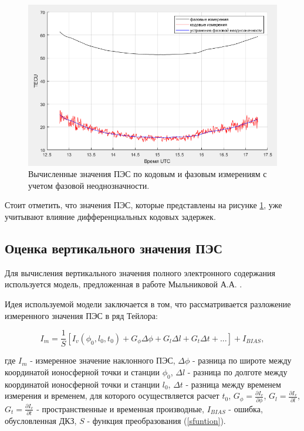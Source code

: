 \documentclass[14pt]{article}
\begin{document}
\begin{figure}[h!]
\centering
\includegraphics[width = 1\linewidth]{pics/stec.png}
\caption{Вычисленные значения ПЭС по кодовым и фазовым измерениям с учетом фазовой неоднозначности.}
\label{stecplot}
\end{figure}

Стоит отметить, что значения ПЭС, которые представлены на рисунке \ref{stecplot}, уже учитывают влияние дифференциальных кодовых задержек.

\subsection{Оценка вертикального значения ПЭС}
Для вычисления вертикального значения полного электронного содержания используется модель, предложенная в работе Мыльниковой А.А. \cite{milnikova}.

Идея используемой модели заключается в том, что рассматривается разложение измеренного значения ПЭС в ряд Тейлора:

\begin{equation}
I_m = \frac{1}{S} \left[ I_v(\phi_0, l_0, t_0) + G_{\phi} \Delta\phi + G_l \Delta l + G_t \Delta t + ... \right] + I_{BIAS},
\label{taylor}
\end{equation}

где $I_m$ - измеренное значение наклонного ПЭС, $\Delta\phi$ - разница по широте между координатой ионосферной точки и станции $\phi_0$, $\Delta l$ - разница по долготе между координатой ионосферной точки и станции $l_0$, $\Delta t$ - разница между временем измерения и временем, для которого осуществляется расчет $t_0$, $G_{\phi} = \frac{\partial I_v}{\partial \phi}$, $G_l = \frac{\partial I_v}{\partial l}$, $G_t = \frac{\partial I_v}{\partial t}$ - пространственные и временная производные, $I_{BIAS}$ - ошибка, обусловленная ДКЗ, $S$ - функция преобразования (\ref{sfuntion}).
\end{document}

